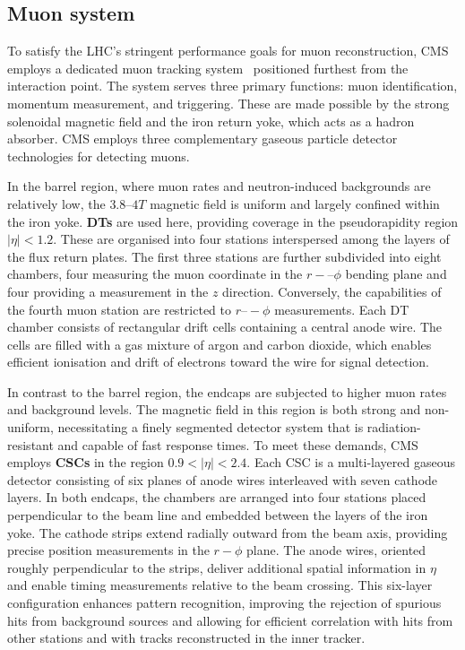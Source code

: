 \subsection{Muon system}
To satisfy the LHC’s stringent performance goals for muon reconstruction, CMS employs a dedicated muon tracking system~\cite{LHC_CMS,CMS_Muon_System_Performance} positioned furthest from the interaction point. The system serves three primary functions: muon identification, momentum measurement, and triggering. These are made possible by the strong solenoidal magnetic field and the iron return yoke, which acts as a hadron absorber.  CMS employs three complementary gaseous particle detector technologies for detecting muons.  

In the barrel region, where muon rates and neutron-induced backgrounds are relatively low, the $3.8–4\unit{T}$ magnetic field is uniform and largely confined within the iron yoke. \textbf{\ac{DTs}} are used here, providing coverage in the pseudorapidity region $|\eta| < 1.2$. These are organised into four stations interspersed among the layers of the flux return plates. The first three stations are further subdivided into eight chambers, four measuring the muon coordinate in the $r-–\phi$ bending plane and four providing a measurement in the $z$ direction. Conversely, the capabilities of the fourth muon station are restricted to $r–-\phi$ measurements. Each DT chamber consists of rectangular drift cells containing a central anode wire. The cells are filled with a gas mixture of argon and carbon dioxide, which enables efficient ionisation and drift of electrons toward the wire for signal detection. 

In contrast to the barrel region, the endcaps are subjected to higher muon rates and background levels. The magnetic field in this region is both strong and non-uniform, necessitating a finely segmented detector system that is radiation-resistant and capable of fast response times. To meet these demands, CMS employs \textbf{\ac{CSCs}} in the region $0.9 < |\eta|<2.4$. Each CSC is a multi-layered gaseous detector consisting of six planes of anode wires interleaved with seven cathode layers. In both endcaps, the chambers are arranged into four stations placed perpendicular to the beam line and embedded between the layers of the iron yoke. The cathode strips extend radially outward from the beam axis, providing precise position measurements in the $r-\phi$ plane. The anode wires, oriented roughly perpendicular to the strips, deliver additional spatial information in $\eta$ and enable timing measurements relative to the beam crossing. This six-layer configuration enhances pattern recognition, improving the rejection of spurious hits from background sources and allowing for efficient correlation with hits from other stations and with tracks reconstructed in the inner tracker.

